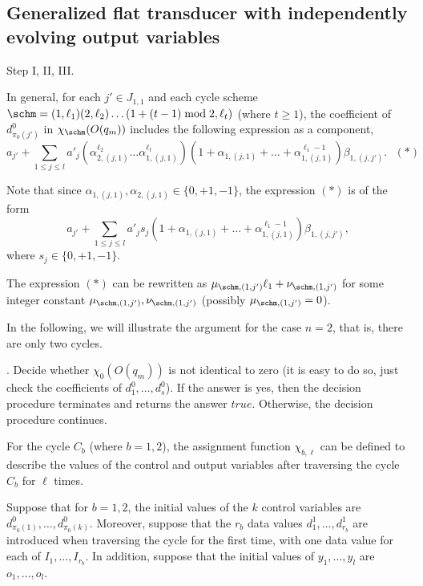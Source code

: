 \subsection{Generalized flat transducer with independently evolving output variables}






Step I, II, III.



In general, for each $j' \in J_{1,1}$ and each cycle scheme $\schm=(1,\ell_1)(2,\ell_2) \dots (1+(t-1) \bmod 2,\ell_{t})$ (where $t \ge 1$), the coefficient of $d^0_{\pi_0(j')}$ in $\chi_{\schm}(O(q_m))$ includes the following expression as a component,
%
\[a_{j'} + \sum \limits_{1 \le j \le l} a'_j (\alpha^{\ell_2}_{2,(j,1)} \dots \alpha^{\ell_t}_{1,(j,1)}) (1+\alpha_{1,(j,1)} + \dots +\alpha^{\ell_1-1}_{1,(j,1)})\beta_{1,(j,j')}. \ \ \  (\ast)\]

Note that since $\alpha_{1,(j,1)},\alpha_{2,(j,1)} \in \{0,+1,-1\}$, the expression $(\ast)$ is of the form 
\[a_{j'} + \sum \limits_{1 \le j \le l} a'_j  s_j (1+\alpha_{1,(j,1)} + \dots +\alpha^{\ell_1-1}_{1,(j,1)})\beta_{1,(j,j')},\]
where $s_j \in \{0,+1,-1\}$.

The expression $(\ast)$ can be rewritten as $\mu_{\schm,(1,j')} \ell_1 + \nu_{\schm,(1,j')}$ for some integer constant $\mu_{\schm,(1,j')},\nu_{\schm,(1,j')}$ (possibly $\mu_{\schm,(1,j')}=0$). 


In the following, we will illustrate the argument for the case $n=2$, that is, there are only two cycles.


\smallskip

. Decide whether $\chi_0(O(q_m))$ is not identical to zero (it is easy to do so, just check the coefficients of $d^0_1, \dots, d^0_s$). If the answer is yes, then the decision procedure terminates and returns the answer $true$. Otherwise, the decision procedure continues.

\smallskip

For the cycle $C_b$ (where $b=1,2$), the assignment function $\chi_{b,\ell}$ can be defined to describe the values of the control and output variables after traversing the cycle $C_b$ for $\ell$ times.

Suppose that for $b=1,2$, the initial values of the $k$ control variables are $d^0_{\pi_0(1)},\dots,d^0_{\pi_0(k)}$. Moreover, suppose that the $r_b$ data values $d^1_{1}, \dots, d^1_{r_b}$ are introduced when traversing the cycle for the first time, with one data value for each of $I_{1},\dots,I_{r_b}$. 
In addition, suppose that the initial values of $y_1,\dots, y_l$ are $o_1,\dots,o_l$. 

